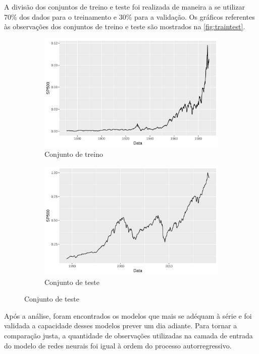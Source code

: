 \documentclass[
    12pt,
    oneside,
    a4paper,
    english,
    brazil
]{abntex2}
\begin{document}
A  divisão dos  conjuntos de  treino  e teste  foi  realizada de  maneira a  se
utilizar 70\% dos dados para o treinamento e 30\% para a validação. Os gráficos
referentes às  observações dos  conjuntos de  treino e  teste são  mostrados na
\autoref{fig:traintest}.

\begin{figure}[ht]
    \caption{Divisão da série entre os conjuntos de treino e teste}\label{fig:traintest}
    \begin{subfigure}{.5\textwidth}
        \centering
        \includegraphics[width=.8\linewidth]{images/SP500_train.png}
        \caption{Conjunto de treino}
    \end{subfigure}
    \begin{subfigure}{.5\textwidth}
        \centering
        \includegraphics[width=.8\linewidth]{images/SP500_test.png}
        \caption{Conjunto de teste}
    \end{subfigure}
\end{figure}

Após a análise, foram encontrados os modelos  que mais se adéquam à série e foi
validada  a capacidade  desses modelos  prever um  dia adiante.  Para tornar  a
comparação justa, a  quantidade de observações utilizadas na  camada de entrada
do modelo de redes neurais foi igual à ordem do processo autorregressivo.
\end{document}
